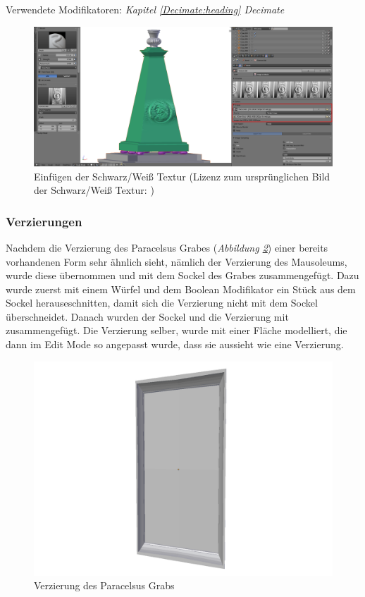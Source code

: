 Verwendete Modifikatoren: \textit{Kapitel \ref{Decimate:heading} \dq Decimate\dq}
\begin{figure}[H]
    \centering
    \includegraphics[width=.8\textwidth]{images/Paracelsus-Grab_Brush.png}
    \caption{Einfügen der Schwarz/Weiß Textur (Lizenz zum ursprünglichen Bild der Schwarz/Weiß Textur: \citep{paracelsusgrab:bild})}
    \label{Paracelsus_Grab:image4}
\end{figure}

\subsubsection{Verzierungen}
Nachdem die Verzierung des Paracelsus Grabes (\textit{Abbildung \ref{Paracelsus_Grab:image3}}) einer bereits vorhandenen Form sehr ähnlich sieht, nämlich der Verzierung des Mausoleums, wurde diese übernommen und
mit dem Sockel des Grabes zusammengefügt. Dazu wurde zuerst mit einem Würfel und dem Boolean Modifikator ein Stück aus dem Sockel herauseschnitten, damit
sich die Verzierung nicht mit dem Sockel überschneidet. Danach wurden der Sockel und die Verzierung mit  zusammengefügt. Die Verzierung selber, wurde mit einer
Fläche modelliert, die dann im Edit Mode so angepasst wurde, dass sie aussieht wie eine Verzierung.
\begin{figure}[H]
    \centering
    \includegraphics[width=.8\textwidth]{images/Paracelsus-Grab_Verzierung.png}
    \caption{Verzierung des Paracelsus Grabs}
    \label{Paracelsus_Grab:image3}
\end{figure}

